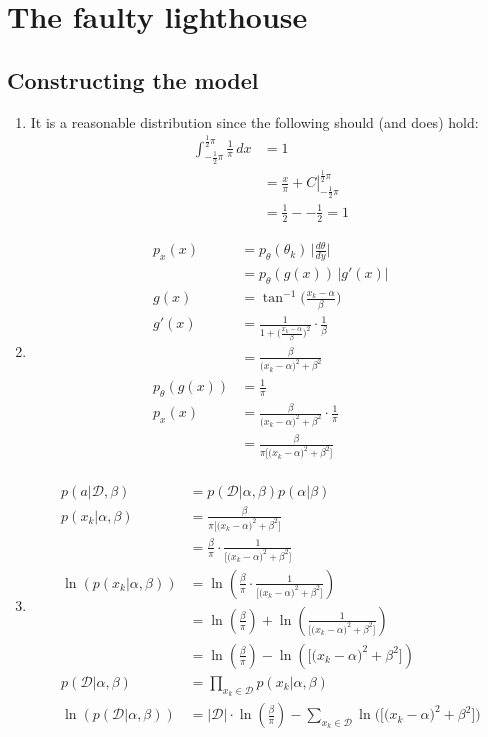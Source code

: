 \documentclass[paper=a4, fontsize=10pt]{scrartcl} %
\numberwithin{equation}{section} %
\numberwithin{figure}{section} %
\numberwithin{table}{section} %
\begin{document}
\section{The faulty lighthouse}
\subsection{Constructing the model}
\begin{enumerate}
	\item It is a reasonable distribution since the following should (and does) hold:
			\begin{align}
				\int_{-\frac{1}{2}\pi}^{\frac{1}{2}\pi} \frac{1}{\pi} \, dx &= 1 \tag{To be proven}\\
				&= \left. \frac{x}{\pi} + C \right|_{-\frac{1}{2}\pi}^{\frac{1}{2}\pi}\\
				&= \frac{1}{2} - - \frac{1}{2} = 1
			\end{align}
	\item 
			\begin{align}
				p_x(x) &= p_\theta(\theta_k) \, \bigg\vert \frac{d\theta}{dy} \bigg\vert \\
				&= p_\theta(g(x)) \, \big\vert g'(x) \big\vert \\
				g(x) &= \tan^{-1} \bigg(\frac{x_k - \alpha}{\beta}\bigg) \\
				g'(x) &= \frac{1}{1 + \bigg(\frac{x_k - \alpha}{\beta}\bigg)^2} \cdot \frac{1}{\beta} \\
				&= \frac{\beta}{\big(x_k - \alpha\big)^2 + \beta^2} \\
				p_\theta(g(x)) &= \frac{1}{\pi} \\
				p_x(x) &= \frac{\beta}{\big(x_k - \alpha\big)^2 + \beta^2} \cdot \frac{1}{\pi} \\
				&= \frac{\beta}{\pi \big[\big(x_k - \alpha\big)^2 + \beta^2\big]} \\
			\end{align}
	\item
			\begin{align}
				p(a \vert \mathcal{D}, \beta) &= p(\mathcal{D} \vert \alpha, \beta)p(\alpha \vert \beta) \\
				p(x_k \vert \alpha, \beta) &= \frac{\beta}{\pi \big[\big(x_k - \alpha\big)^2 + \beta^2\big]} \\
				&= \frac{\beta}{\pi} \cdot \frac{1}{\big[\big(x_k - \alpha\big)^2 + \beta^2\big]} \\
				\ln(p(x_k \vert \alpha, \beta)) &= \ln(\frac{\beta}{\pi} \cdot \frac{1}{\big[\big(x_k - \alpha\big)^2 + \beta^2\big]}) \\
				&= \ln(\frac{\beta}{\pi}) + \ln(\frac{1}{\big[\big(x_k - \alpha\big)^2 + \beta^2\big]}) \\
				&= \ln(\frac{\beta}{\pi}) - \ln(\big[\big(x_k - \alpha\big)^2 + \beta^2\big]) \\
				p(\mathcal{D} \vert \alpha, \beta) &= \prod_{x_k \in \mathcal{D}} p(x_k \vert \alpha, \beta) \\
				\ln(p(\mathcal{D} \vert \alpha, \beta)) &= \vert \mathcal{D} \vert \cdot \ln(\frac{\beta}{\pi}) - \sum_{x_k \in \mathcal{D}} \ln\big(\big[\big(x_k - \alpha\big)^2 + \beta^2\big]\big) 
			\end{align}


\end{enumerate}
\end{document}
